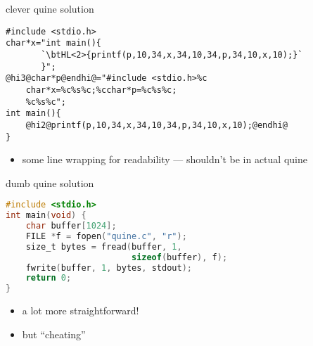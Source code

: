 \begin{frame}[fragile,label=quineClever]{clever quine solution}
\begin{lstlisting}
#include <stdio.h>
char*x="int main(){
       `\btHL<2>{printf(p,10,34,x,34,10,34,p,34,10,x,10);}`
       }";
@hi3@char*p@endhi@="#include <stdio.h>%c
    char*x=%c%s%c;%cchar*p=%c%s%c;
    %c%s%c";
int main(){
    @hi2@printf(p,10,34,x,34,10,34,p,34,10,x,10);@endhi@
}
\end{lstlisting}
\begin{itemize}
\item some line wrapping for readability --- shouldn't be in actual quine
\end{itemize}
\end{frame}

\begin{frame}[fragile,label=quineDumb]{dumb quine solution}
\begin{lstlisting}[language=C,style=small]
#include <stdio.h>
int main(void) {
    char buffer[1024];
    FILE *f = fopen("quine.c", "r");
    size_t bytes = fread(buffer, 1,
                         sizeof(buffer), f);
    fwrite(buffer, 1, bytes, stdout);
    return 0;
}
\end{lstlisting}
\begin{itemize}
\item a lot more straightforward!
\item but ``cheating''
\end{itemize}
\end{frame}

